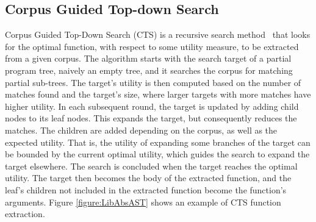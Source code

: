 \subsection{Corpus Guided Top-down Search}
Corpus Guided Top-Down Search (CTS) is a recursive search method~\cite{Bowers_2023stitch} that looks for the optimal function, with respect to some utility measure, to be extracted from a given corpus. The algorithm starts with the search target of a partial program tree, naively an empty tree, and it searches the corpus for matching partial sub-trees. The target's utility is then computed based on the number of matches found and the target's size, where larger targets with more matches have higher utility. In each subsequent round, the target is updated by adding child nodes to its leaf nodes. This expands the target, but consequently reduces the matches. The children are added depending on the corpus, as well as the expected utility. That is, the utility of expanding some branches of the target can be bounded by the current optimal utility, which guides the search to expand the target elsewhere. The search is concluded when the target reaches the optimal utility. The target then becomes the body of the extracted function, and the leaf's children not included in the extracted function become the function's arguments. Figure \ref{figure:LibAbsAST} shows an example of CTS function extraction.  %


